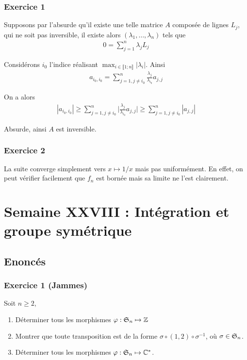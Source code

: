 \documentclass{article}
\begin{document}
\subsubsection*{Exercice 1}
Supposons par l'absurde qu'il existe une telle matrice  $A$ composée de lignes $L_j$, qui ne soit pas inversible, il existe alors $(\lambda_1,\ldots, \lambda_n)$ tels que 
\begin{align*}
0 = \sum_{j=1}^n \lambda_j L_j
\end{align*}

Considérons $i_0$ l'indice réalisant $\max_{i\in\llbracket 1;n\rrbracket} |\lambda_i|$. Ainsi
\begin{align*}
a_{i_0,i_0}= \sum_{j=1,j\neq i_0}^n \frac{\lambda_j}{\lambda_{i_0}}a_{j,j}
\end{align*}

On a alors
\begin{align*}
|a_{i_0,i_0}| \geq \sum_{j=1,j\neq i_0}^n \bigg|\frac{\lambda_j}{\lambda_{i_0}} a_{j,j}\bigg|\geq \sum_{j=1,j\neq i_0}^n |a_{j,j}|
\end{align*}

Absurde, ainsi $A$ est inversible.
\subsubsection*{Exercice 2}
La suite converge simplement vers $x \mapsto 1/x$ mais pas uniformément. En effet, on peut vérifier facilement que $f_n$ est bornée mais sa limite ne l'est clairement. 
\section{Semaine XXVIII : Intégration et groupe symétrique}
\subsection*{Enoncés}
\subsubsection*{Exercice 1 (Jammes)}
Soit $n\geq 2$,
\begin{enumerate}
\item Déterminer tous les morphismes $\varphi : \frak{S}_n \mapsto \mathbb{Z}$
\item Montrer que toute transposition est de la forme $\sigma \circ (1, 2) \circ \sigma^{-1}$, où $\sigma\in\frak{S}_n$.
\item Déterminer tous les morphismes $\varphi : \frak{S}_n \mapsto \mathbb{C}^*$.
\end{enumerate}
\end{document}
